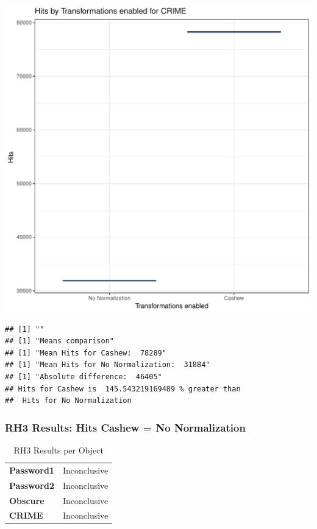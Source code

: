 \documentclass{article}\usepackage[]{graphicx}\usepackage[]{color}
\makeatletter
\def\maxwidth{ %
  \ifdim\Gin@nat@width>\linewidth
    \linewidth
  \else
    \Gin@nat@width
  \fi
}
\newenvironment{kframe}{%
 \def\at@end@of@kframe{}%
 \ifinner\ifhmode%
  \def\at@end@of@kframe{\end{minipage}}%
  \begin{minipage}{\columnwidth}%
 \fi\fi%
 \def\FrameCommand##1{\hskip\@totalleftmargin \hskip-\fboxsep
 \colorbox{shadecolor}{##1}\hskip-\fboxsep
     \hskip-\linewidth \hskip-\@totalleftmargin \hskip\columnwidth}%
 \MakeFramed {\advance\hsize-\width
   \@totalleftmargin\z@ \linewidth\hsize
   \@setminipage}}%
 {\par\unskip\endMakeFramed%
 \at@end@of@kframe}
\newenvironment{knitrout}{}{} %
\makeatother
\begin{document}
\begin{knitrout}
\color{fgcolor}
\includegraphics[width=\maxwidth]{figure/RH3_crime-1} 
\begin{kframe}

{\ttfamily\noindent\bfseries\color{errorcolor}{\#\# Error in eval(expr, envir, enclos): object 'shap\_cashew\_crime' not found}}\begin{verbatim}
## [1] ""
## [1] "Means comparison"
## [1] "Mean Hits for Cashew:  78289"
## [1] "Mean Hits for No Normalization:  31884"
## [1] "Absolute difference:  46405"
## Hits for Cashew is  145.543219169489 % greater than 
##  Hits for No Normalization
\end{verbatim}
\end{kframe}
\end{knitrout}


 

	
	\subsubsection{RH3 Results: Hits Cashew = No Normalization}
	
	
	\begin{table}[H]
	\centering
	\caption{RH3 Results per Object}
	\begin{tabular}{ll}
	\textbf{Password1} & Inconclusive \\
	\textbf{Password2} & Inconclusive \\
	\textbf{Obscure} & Inconclusive \\
	\textbf{CRIME} & Inconclusive \\
	\end{tabular}
	\end{table}
\end{document}
